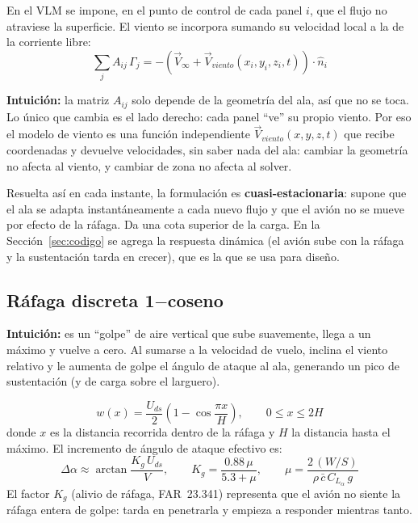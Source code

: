 \documentclass[11pt]{article}
\begin{document}
En el VLM se impone, en el punto de control de cada panel $i$, que el flujo
no atraviese la superficie. El viento se incorpora sumando su velocidad
local a la de la corriente libre:
\begin{equation}
\sum_j A_{ij}\,\Gamma_j = -\left(\vec V_\infty + \vec V_{viento}(x_i,y_i,z_i,t)\right)\cdot\hat n_i
\label{eq:vlm-viento}
\end{equation}

\textbf{Intuición:} la matriz $A_{ij}$ solo depende de la geometría del ala,
así que no se toca. Lo único que cambia es el lado derecho: cada panel
``ve'' su propio viento. Por eso el modelo de viento es una función
independiente $\vec V_{viento}(x,y,z,t)$ que recibe coordenadas y devuelve
velocidades, sin saber nada del ala: cambiar la geometría no afecta al
viento, y cambiar de zona no afecta al solver.

Resuelta así en cada instante, la formulación es \textbf{cuasi-estacionaria}:
supone que el ala se adapta instantáneamente a cada nuevo flujo y que el
avión no se mueve por efecto de la ráfaga. Da una cota superior de la carga.
En la Sección~\ref{sec:codigo} se agrega la respuesta dinámica (el avión sube
con la ráfaga y la sustentación tarda en crecer), que es la que se usa para
diseño.

\subsection{Ráfaga discreta 1$-$coseno}

\textbf{Intuición:} es un ``golpe'' de aire vertical que sube suavemente,
llega a un máximo y vuelve a cero. Al sumarse a la velocidad de vuelo, inclina
el viento relativo y le aumenta de golpe el ángulo de ataque al ala,
generando un pico de sustentación (y de carga sobre el larguero).

\begin{equation}
w(x) = \frac{U_{ds}}{2}\left(1-\cos\frac{\pi x}{H}\right),\qquad 0\leq x\leq 2H
\end{equation}
donde $x$ es la distancia recorrida dentro de la ráfaga y $H$ la distancia
hasta el máximo. El incremento de ángulo de ataque efectivo es:
\begin{equation}
\Delta\alpha \approx \arctan\frac{K_g\,U_{ds}}{V},\qquad
K_g = \frac{0.88\,\mu}{5.3+\mu},\qquad
\mu = \frac{2\,(W/S)}{\rho\,\bar c\,C_{L_\alpha}\,g}
\end{equation}
El factor $K_g$ (alivio de ráfaga, FAR~23.341) representa que el avión no
siente la ráfaga entera de golpe: tarda en penetrarla y empieza a responder
mientras tanto.
\end{document}
